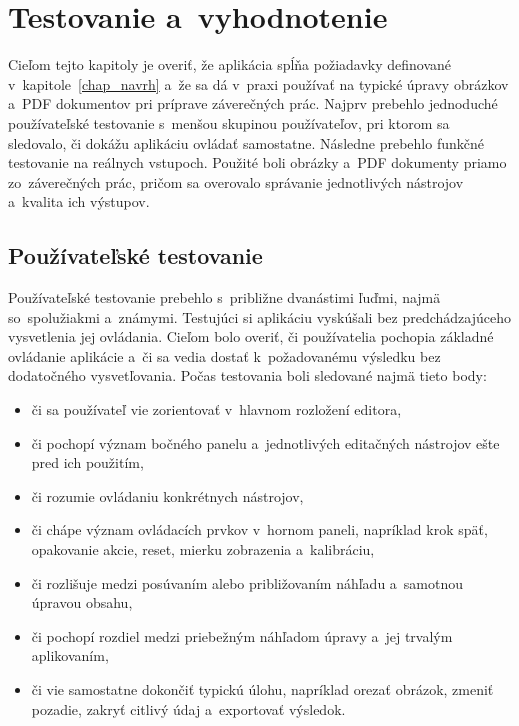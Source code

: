 \chapter{Testovanie a~vyhodnotenie}
\label{chap_testovanie}

Cieľom tejto kapitoly je overiť, že aplikácia spĺňa požiadavky definované v~kapitole~\ref{chap_navrh} a~že sa dá v~praxi používať na typické úpravy obrázkov a~PDF dokumentov pri príprave záverečných prác. Najprv prebehlo jednoduché používateľské testovanie s~menšou skupinou používateľov, pri ktorom sa sledovalo, či dokážu aplikáciu ovládať samostatne. Následne prebehlo funkčné testovanie na reálnych vstupoch. Použité boli obrázky a~PDF dokumenty priamo zo~záverečných prác, pričom sa overovalo správanie jednotlivých nástrojov a~kvalita ich výstupov.

\section{Používateľské testovanie}
\label{sec:user_testing}

Používateľské testovanie prebehlo s~približne dvanástimi ľuďmi, najmä so~spolužiakmi a~známymi. Testujúci si aplikáciu vyskúšali bez predchádzajúceho vysvetlenia jej ovládania. Cieľom bolo overiť, či používatelia pochopia základné ovládanie aplikácie a~či sa vedia dostať k~požadovanému výsledku bez dodatočného vysvetľovania. Počas testovania boli sledované najmä tieto body:
\begin{itemize}
    \item či sa používateľ vie zorientovať v~hlavnom rozložení editora,
    \item či pochopí význam bočného panelu a~jednotlivých editačných nástrojov ešte pred ich použitím,
    \item či rozumie ovládaniu konkrétnych nástrojov,
    \item či chápe význam ovládacích prvkov v~hornom paneli, napríklad krok späť, opakovanie akcie, reset, mierku zobrazenia a~kalibráciu,
    \item či rozlišuje medzi posúvaním alebo približovaním náhľadu a~samotnou úpravou obsahu,
    \item či pochopí rozdiel medzi priebežným náhľadom úpravy a~jej trvalým aplikovaním,
    \item či vie samostatne dokončiť typickú úlohu, napríklad orezať obrázok, zmeniť pozadie, zakryť citlivý údaj a~exportovať výsledok.
\end{itemize}

